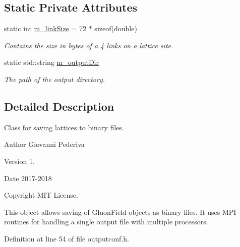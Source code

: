 \subsection*{Static Private Attributes}
\begin{DoxyCompactItemize}
\item 
static int \hyperlink{classLatticeIO_1_1OutputConf_a6866129cf7fe3c5e36034296b2e1bf15}{m\+\_\+link\+Size} = 72 $\ast$ sizeof(double)\hypertarget{classLatticeIO_1_1OutputConf_a6866129cf7fe3c5e36034296b2e1bf15}{}\label{classLatticeIO_1_1OutputConf_a6866129cf7fe3c5e36034296b2e1bf15}

\begin{DoxyCompactList}\small\item\em Contains the size in bytes of a 4 links on a lattice site. \end{DoxyCompactList}\item 
static std\+::string \hyperlink{classLatticeIO_1_1OutputConf_a99c20c25ac656605f5d42f5d3bd8b9d4}{m\+\_\+output\+Dir}\hypertarget{classLatticeIO_1_1OutputConf_a99c20c25ac656605f5d42f5d3bd8b9d4}{}\label{classLatticeIO_1_1OutputConf_a99c20c25ac656605f5d42f5d3bd8b9d4}

\begin{DoxyCompactList}\small\item\em The path of the output directory. \end{DoxyCompactList}\end{DoxyCompactItemize}


\subsection{Detailed Description}
Class for saving lattices to binary files. 

\begin{DoxyAuthor}{Author}
Giovanni Pederiva 
\end{DoxyAuthor}
\begin{DoxyVersion}{Version}
1. 
\end{DoxyVersion}
\begin{DoxyDate}{Date}
2017-\/2018 
\end{DoxyDate}
\begin{DoxyCopyright}{Copyright}
M\+IT License.
\end{DoxyCopyright}
This object allows saving of Gluon\+Field objects as binary files. It uses M\+PI routines for handling a single output file with multiple processors. 

Definition at line 54 of file outputconf.\+h.



